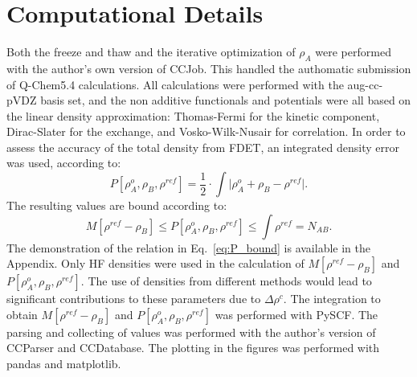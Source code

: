 \documentclass[journal=jctcce,manuscript=article, layout=twocolumn]{achemso}
\begin{document}
\section{Computational Details} \label{sect:comp_det}
Both the freeze and thaw and the iterative optimization of $\rho_A$ were performed with the author's own version\cite{CCJob_Ricardi} of CCJob\cite{CCJob_Zech}. This handled the authomatic submission of Q-Chem5.4\cite{Qchem54} calculations. 
All calculations were performed with the aug-cc-pVDZ basis set, and the non additive functionals and potentials were all based on the linear density approximation: Thomas-Fermi\cite{Thomas1927, Fermi1928} for the kinetic component, Dirac-Slater\cite{Slater1929} for the exchange, and Vosko-Wilk-Nusair\cite{Vosko1980} for correlation.
In order to assess the accuracy of the total density from FDET, an integrated density error was used, according to:
\begin{equation}
 P[\rho^{o}_A, \rho_B, \rho^{ref}] = \frac{1}{2} \cdot \int \vert \rho^{o}_A + \rho_B - \rho^{ref} \vert .
\end{equation}
The resulting values are bound according to:
\begin{equation} \label{eq:P_bound}
 M[\rho^{ref} - \rho_B] \leq P[\rho^{o}_A, \rho_B, \rho^{ref}] \leq \int \rho^{ref} = N_{AB}.
\end{equation}
The demonstration of the relation in Eq.~\ref{eq:P_bound} is available in the Appendix.
Only HF densities were used in the calculation of $M[\rho^{ref} - \rho_B]$ and $P[\rho^{o}_A, \rho_B, \rho^{ref}]$. The use of densities from different methods would lead to significant contributions to these parameters due to $\Delta \rho^c$.
The integration to obtain $M[\rho^{ref} - \rho_B]$ and $P[\rho^{o}_A, \rho_B, \rho^{ref}]$ was performed with  PySCF\cite{PYSCF}.
The parsing and collecting of values was performed with the author's version\cite{CCParser_Ricardi} of CCParser\cite{CCParser_Zech} and CCDatabase\cite{CCDatabase}. The plotting in the figures was performed with pandas\cite{PANDAS} and matplotlib\cite{Hunter2007}.
\end{document}
